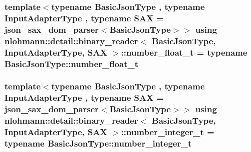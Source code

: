 \subsubsection[{\texorpdfstring{number\+\_\+float\+\_\+t}{number_float_t}}]{\setlength{\rightskip}{0pt plus 5cm}template$<$typename Basic\+Json\+Type , typename Input\+Adapter\+Type , typename S\+AX  = json\+\_\+sax\+\_\+dom\+\_\+parser$<$\+Basic\+Json\+Type$>$$>$ using {\bf nlohmann\+::detail\+::binary\+\_\+reader}$<$ Basic\+Json\+Type, Input\+Adapter\+Type, S\+AX $>$\+::{\bf number\+\_\+float\+\_\+t} =  typename Basic\+Json\+Type\+::number\+\_\+float\+\_\+t\hspace{0.3cm}{\ttfamily [private]}}\hypertarget{classnlohmann_1_1detail_1_1binary__reader_ae4f1a7d10118d578ad03f7ee36df6fbe}{}\label{classnlohmann_1_1detail_1_1binary__reader_ae4f1a7d10118d578ad03f7ee36df6fbe}
\subsubsection[{\texorpdfstring{number\+\_\+integer\+\_\+t}{number_integer_t}}]{\setlength{\rightskip}{0pt plus 5cm}template$<$typename Basic\+Json\+Type , typename Input\+Adapter\+Type , typename S\+AX  = json\+\_\+sax\+\_\+dom\+\_\+parser$<$\+Basic\+Json\+Type$>$$>$ using {\bf nlohmann\+::detail\+::binary\+\_\+reader}$<$ Basic\+Json\+Type, Input\+Adapter\+Type, S\+AX $>$\+::{\bf number\+\_\+integer\+\_\+t} =  typename Basic\+Json\+Type\+::number\+\_\+integer\+\_\+t\hspace{0.3cm}{\ttfamily [private]}}\hypertarget{classnlohmann_1_1detail_1_1binary__reader_a2b46c2a929071fdb0b028befa77814bd}{}\label{classnlohmann_1_1detail_1_1binary__reader_a2b46c2a929071fdb0b028befa77814bd}
